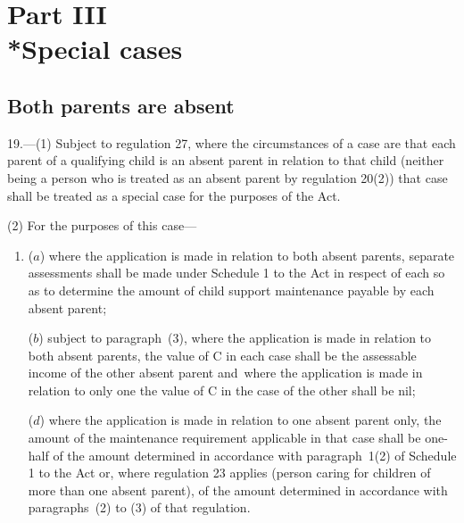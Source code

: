 \documentclass[12pt,a4paper]{article}
\begin{document}

\vfill

\section[Part III --- Special cases]{Part III\\*Special cases}

\renewcommand\parthead{--- Part III}

\subsection[19. Both parents are absent]{Both parents are absent}

19.—(1) Subject to regulation 27, where the circumstances of a case are that each parent of a qualifying child is an absent parent in relation to that child (neither being a person who is treated as an absent parent by regulation 20(2)) that case shall be treated as a special case for the purposes of the Act.

(2) For the purposes of this case—
\begin{enumerate}\item[]
($a$) where the application is made in relation to both absent parents, separate assessments shall be made under Schedule 1 to the Act in respect of each so as to determine the amount of child support maintenance payable by each absent parent;

($b$) subject to paragraph~(3), where the application is made in relation to both absent parents, the value of C in each case shall be the assessable income of the other absent parent and~where the application is made in relation to only one the value of C in the case of the other shall be nil;


($d$) where the application is made in relation to one absent parent only, the amount of the maintenance requirement applicable in that case shall be one-half of the amount determined in accordance with paragraph~1(2) of Schedule 1 to the Act or, where regulation 23 applies (person caring for children of more than one absent parent), of the amount determined in accordance with paragraphs~(2) to (3) of that regulation.
\end{enumerate}
\end{document}
